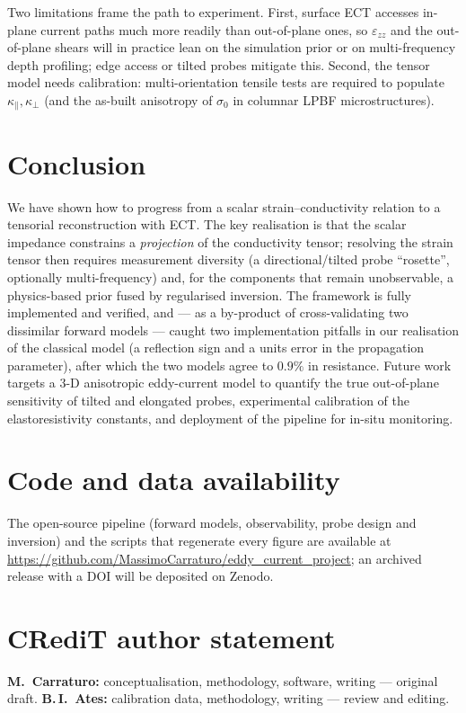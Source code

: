 \documentclass[11pt]{article}
\begin{document}
Two limitations frame the path to experiment. First, surface ECT accesses
in-plane current paths much more readily than out-of-plane ones, so
$\varepsilon_{zz}$ and the out-of-plane shears will in practice lean on the
simulation prior or on multi-frequency depth profiling; edge access or tilted
probes mitigate this. Second, the tensor model needs calibration:
multi-orientation tensile tests are required to populate
$\kappa_\parallel,\kappa_\perp$ (and the as-built anisotropy of $\sigma_0$ in
columnar LPBF microstructures).

\section{Conclusion}
We have shown how to progress from a scalar strain--conductivity relation to a
tensorial reconstruction with ECT. The key realisation is that the scalar
impedance constrains a \emph{projection} of the conductivity tensor; resolving
the strain tensor then requires measurement diversity (a directional/tilted probe
``rosette'', optionally multi-frequency) and, for the components that remain
unobservable, a physics-based prior fused by regularised inversion. The framework
is fully implemented and verified, and --- as a by-product of cross-validating
two dissimilar forward models --- caught two implementation pitfalls in our
realisation of the classical model (a reflection sign and a units error in the
propagation parameter), after which the two models agree to $0.9\%$ in
resistance. Future work targets a 3-D anisotropic eddy-current model to quantify
the true out-of-plane sensitivity of tilted and elongated probes, experimental
calibration of the elastoresistivity constants, and deployment of the pipeline
for in-situ monitoring.

\section*{Code and data availability}
The open-source pipeline (forward models, observability, probe design and
inversion) and the scripts that regenerate every figure are available at
\url{https://github.com/MassimoCarraturo/eddy_current_project}; an archived
release with a DOI will be deposited on Zenodo.

\section*{CRediT author statement}
\textbf{M.\ Carraturo:} conceptualisation, methodology, software, writing ---
original draft. \textbf{B.\,I.\ Ates:} calibration data, methodology, writing ---
review and editing.
\end{document}
